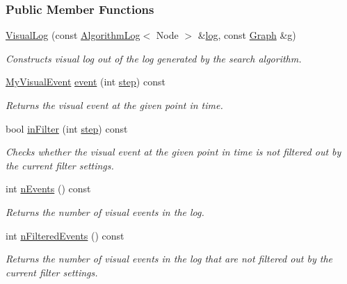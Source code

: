 \subsubsection*{Public Member Functions}
\begin{DoxyCompactItemize}
\item 
\hyperlink{structVisualLog_a86817e5b03bb9a6bc435433483672930}{Visual\+Log} (const \hyperlink{structAlgorithmLog}{Algorithm\+Log}$<$ Node $>$ \&\hyperlink{structVisualLog_a8cc59cd7db2c7053684340d8ce980c7b}{log}, const \hyperlink{structStateGraph}{Graph} \&g)
\begin{DoxyCompactList}\small\item\em Constructs visual log out of the log generated by the search algorithm. \end{DoxyCompactList}\item 
\hyperlink{structVisualLog_a4becdb7d1f763e250a3ace276b111bcb}{My\+Visual\+Event} \hyperlink{structVisualLog_a7fa69f88b600bd2f25f5b3b9d2caf181}{event} (int \hyperlink{structVisualLog_a7fb296e9d2f755787cd1a0e2e16a0e77}{step}) const 
\begin{DoxyCompactList}\small\item\em Returns the visual event at the given point in time. \end{DoxyCompactList}\item 
bool \hyperlink{structVisualLog_a206f0b3092af7c45dd2a69f98fc36c29}{in\+Filter} (int \hyperlink{structVisualLog_a7fb296e9d2f755787cd1a0e2e16a0e77}{step}) const 
\begin{DoxyCompactList}\small\item\em Checks whether the visual event at the given point in time is not filtered out by the current filter settings. \end{DoxyCompactList}\item 
int \hyperlink{structVisualLog_a7ba6f4d9c7e66d7dd59d88d27de7179b}{n\+Events} () const 
\begin{DoxyCompactList}\small\item\em Returns the number of visual events in the log. \end{DoxyCompactList}\item 
int \hyperlink{structVisualLog_a36105c1fc60348e9bbef1bffa08a3a71}{n\+Filtered\+Events} () const 
\begin{DoxyCompactList}\small\item\em Returns the number of visual events in the log that are not filtered out by the current filter settings. \end{DoxyCompactList}\item 

\end{DoxyCompactItemize}
